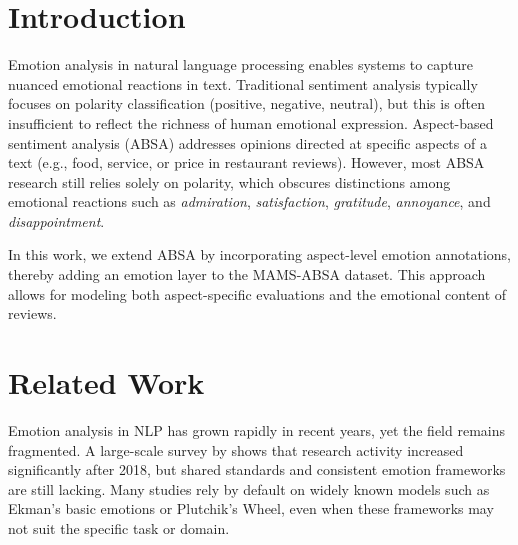 \documentclass[10pt]{article}
\begin{document}
\pagecolor{white}\color{black}

\newpage
\begingroup
  \thispagestyle{empty}
  \singlespacing
  \setlength{\parskip}{0pt}
  \setcounter{tocdepth}{2}
  \tableofcontents
\endgroup

\newpage
{}
\setcounter{page}{1}

\section{Introduction}

Emotion analysis in natural language processing enables systems to capture nuanced emotional reactions in text. Traditional sentiment analysis typically focuses on polarity classification (positive, negative, neutral), but this is often insufficient to reflect the richness of human emotional expression. Aspect-based sentiment analysis (ABSA) addresses opinions directed at specific aspects of a text (e.g., food, service, or price in restaurant reviews). However, most ABSA research still relies solely on polarity, which obscures distinctions among emotional reactions such as \emph{admiration}, \emph{satisfaction}, \emph{gratitude}, \emph{annoyance}, and \emph{disappointment}.

In this work, we extend ABSA by incorporating aspect-level emotion annotations, thereby adding an emotion layer to the MAMS-ABSA dataset. This approach allows for modeling both aspect-specific evaluations and the emotional content of reviews.

\section{Related Work}

Emotion analysis in NLP has grown rapidly in recent years, yet the field remains fragmented. A large-scale survey by \citet{plazadelarco2024} shows that research activity increased significantly after 2018, but shared standards and consistent emotion frameworks are still lacking. Many studies rely by default on widely known models such as Ekman's basic emotions or Plutchik's Wheel, even when these frameworks may not suit the specific task or domain.
\end{document}
